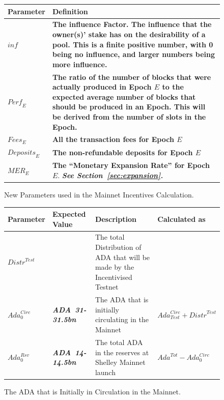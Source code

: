 \documentclass[11pt,a4paper,dvipsnames,twosided,final]{article}
\newcommand{\ada}{ADA{}}
\newcommand{\ADA}[1]{\textbf{\emph{\ada~{#1}}}}
\begin{document}
\begin{figure}[h!]
\begin{center}
\begin{tabular}{||l|p{13cm}||}
  \hline \hline
  \textbf{Parameter} & \textbf{Definition} \\\hline
\textbf{\color{green}  $\textit{inf}$} & \textbf{\color{green} The influence Factor. The influence that the owner(s)' stake has on the
  desirability of a pool. This is a finite positive number, with 0 being no influence, and larger numbers being more influence. } \\\hline
\textbf{\color{cyan}  $\textit{Perf}_E$} & \textbf{\color{cyan} The ratio of the number of blocks that were actually produced in Epoch $E$ to the expected average number of blocks that should be produced in an Epoch.
  This will be derived from the number of slots in the Epoch.} \\\hline
\textbf{\color{cyan}$\textit{Fees}_E$} & \textbf{\color{cyan}All the transaction fees for Epoch $E$} \\\hline
\textbf{\color{cyan}$\textit{Deposits}_E$} & \textbf{\color{cyan} The non-refundable deposits for Epoch $E$} \\\hline
\textbf{\color{cyan} $\textit{MER}_E$} & \textbf{\color{cyan} The ``Monetary Expansion Rate'' for Epoch $E$}. \newline \textbf{\color{cyan} \emph{See Section~\ref{sec:expansion}.}} \\\hline
\hline
\end{tabular}
\end{center}
\caption{New Parameters used in the Mainnet Incentives Calculation.}
\end{figure}

\clearpage
\begin{figure}[h!]
\begin{center}
\begin{tabular}{||l|l|p{6cm}|l||}
  \hline \hline
\textbf{Parameter} & \textbf{Expected Value} & \textbf{Description} & \textbf{Calculated as} \\\hline
${\textit{Distr}}^{Test}$ & & The total Distribution of \ada{} that will be made by the Incentivised Testnet & \\\hline
$\textit{Ada}^{\textit{Circ}}_{0}$ & \ADA{31-31.5bn} & The \ada{} that is initially circulating in the Mainnet & $\textit{Ada}^{\textit{Circ}}_{\textit{Test}} + {\textit{Distr}}^{\textit{Test}}$ \\\hline
$\textit{Ada}^{\textit{Rsv}}_{0}$ & \ADA{14-14.5bn} & The total \ada{} in the reserves at Shelley Mainnet launch & $\textit{Ada}^{Tot} - \textit{Ada}^{\textit{Circ}}_{0}$ \\\hline
\hline
\end{tabular}
\end{center}
\caption{The \ada{} that is Initially in Circulation in the Mainnet.}
\end{figure}
\end{document}
